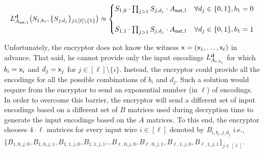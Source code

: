 \begin{equation*}
L_{A_{\out,1}}^{\bfd}\big(S_{1,b_1},\{S_{j,d_j}\}_{j \in[\ell]\setminus\{1\}}\big)\approx \begin{cases} S_{1,0}\cdot \prod_{j>1} S_{j,d_j}\cdot A_{\out,1}  & \forall d_j\in \bit, b_1=0\\&\\
                      S_{1,1}\cdot \prod_{j>1} S_{j,d_j}\cdot A_{\out,1}                                   & \forall d_j\in \bit, b_1=1     %
        \end{cases}
         \end{equation*}


Unfortunately, the encryptor does not know the witness $\mathsf{x}=(\mathsf{x}_1,\ldots,\mathsf{x}_\ell)$ in advance. That said, he cannot provide only the input encodings $L_{A_{i,b_i}}^{\mathbf d}$ for which $b_i=\mathsf{x}_i$ and $d_j=\mathsf{x}_j$ for $j\in[\ell]\setminus\{i\}$. Instead, the encryptor could provide all the encodings for all the possible combinations of $b_i$ and $d_j$. Such a solution would require from the encryptor to send an exponential number (in $\ell$) of encodings. In order to overcome this barrier, the encryptor will send a different set of input encodings based on a different set of ${B}$ matrices used during decryption time to generate the input encodings based on the ${A}$ matrices. To this end, the encryptor chooses $4\cdot \ell$ matrices for every input wire $i\in[\ell]$ denoted by $B_{i,b_i,j,d_j}$ i.e., $\{B_{1,0,j,0},B_{1,0,j,1},B_{1,1,j,0},B_{1,1,j,1}\ldots {B_{\ell,0,j,0},B_{\ell,0,j,1},B_{\ell,1,j,0},B_{\ell,1,j,1}}\}_{j\in[\ell]}$.


